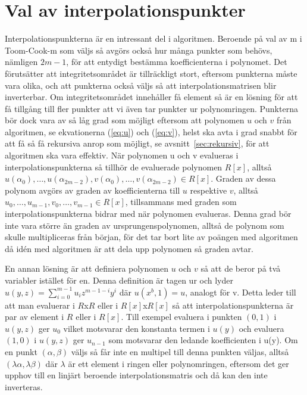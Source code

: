 \section{Val av interpolationspunkter}
Interpolationspunkterna är en intressant del i algoritmen. Beroende på val av m
i Toom-Cook-m som väljs så avgörs också hur många punkter som behövs, nämligen
$2m-1$, för att entydigt bestämma koefficienterna i polynomet. Det förutsätter
att integritetsområdet är tillräckligt stort, eftersom punkterna måste vara
olika, och att punkterna också väljs så att interpolationsmatrisen blir
inverterbar. Om integritetsområdet innehåller få element så är en lösning för
att få tillgång till fler punkter att vi även tar punkter ur polynomringen.
Punkterna bör dock vara av så låg grad som möjligt eftersom att polynomen $u$ och
$v$ från algoritmen, se ekvationerna (\ref {eq:u}) och (\ref{eq:v}), helst ska
avta i grad snabbt för att få så få rekursiva anrop som möjligt, se
avsnitt~\ref{sec:rekursiv}, för att algoritmen ska vara effektiv. När polynomen
u och v evalueras i interpolationspunkterna så tillhör de evaluerade polynomen
$R[x]$, alltså
$u(\alpha_0),\dots,u(\alpha_{2m-2}),v(\alpha_0),\dots,v(\alpha_{2m-2}) \in
R[x]$. Graden av dessa polynom avgörs av graden av koefficienterna till $u$
respektive $v$, alltså $u_0,\dots,u_{m-1},v_0,\dots,v_{m-1} \in R[x]$,
tillsammans med graden som interpolationspunkterna bidrar med när polynomen
evalueras. Denna grad bör inte vara större än graden av ursprungenspolynomen,
alltså de polynom som skulle multipliceras från början, för det tar bort lite
av poängen med algoritmen då idén med algoritmen är att dela upp polynomen så
graden avtar.

En annan lösning är att definiera polynomen $u$ och $v$ så att de beror på två
variabler istället för en. Denna definition är tagen ur \cite{bodrato2007notes}
och lyder $u(y,z) = \displaystyle\sum\limits_{i=0}^{m-1} {u_iz^{m-1-i}y^i}$ där
$u(x^b,1) = u$, analogt för v. Detta leder till att man evaluerar i $R$x$R$
eller i $R[x]$x$R[x]$ så att interpolationspunkterna är par av element i $R$
eller i $R[x]$. Till exempel evaluera i punkten $(0,1)$ i $u(y,z)$ ger $u_0$
vilket motsvarar den konstanta termen i $u(y)$ och evaluera $(1,0)$ i $u(y,z)$
ger $u_{n-1}$ som motsvarar den ledande koefficienten i u(y). Om en punkt
$(\alpha,\beta)$ väljs så får inte en multipel till denna punkten väljas,
alltså $(\lambda\alpha,\lambda\beta)$ där $\lambda$ är ett element i ringen
eller polynomringen, eftersom det ger upphov till en linjärt beroende
interpolationsmatris och då kan den inte inverteras.
